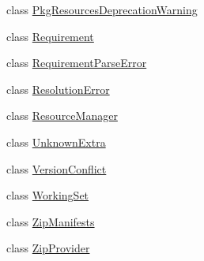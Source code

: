 \begin{DoxyCompactItemize}
\item 
class \hyperlink{classpkg__resources_1_1PkgResourcesDeprecationWarning}{Pkg\+Resources\+Deprecation\+Warning}
\item 
class \hyperlink{classpkg__resources_1_1Requirement}{Requirement}
\item 
class \hyperlink{classpkg__resources_1_1RequirementParseError}{Requirement\+Parse\+Error}
\item 
class \hyperlink{classpkg__resources_1_1ResolutionError}{Resolution\+Error}
\item 
class \hyperlink{classpkg__resources_1_1ResourceManager}{Resource\+Manager}
\item 
class \hyperlink{classpkg__resources_1_1UnknownExtra}{Unknown\+Extra}
\item 
class \hyperlink{classpkg__resources_1_1VersionConflict}{Version\+Conflict}
\item 
class \hyperlink{classpkg__resources_1_1WorkingSet}{Working\+Set}
\item 
class \hyperlink{classpkg__resources_1_1ZipManifests}{Zip\+Manifests}
\item 
class \hyperlink{classpkg__resources_1_1ZipProvider}{Zip\+Provider}
\end{DoxyCompactItemize}
